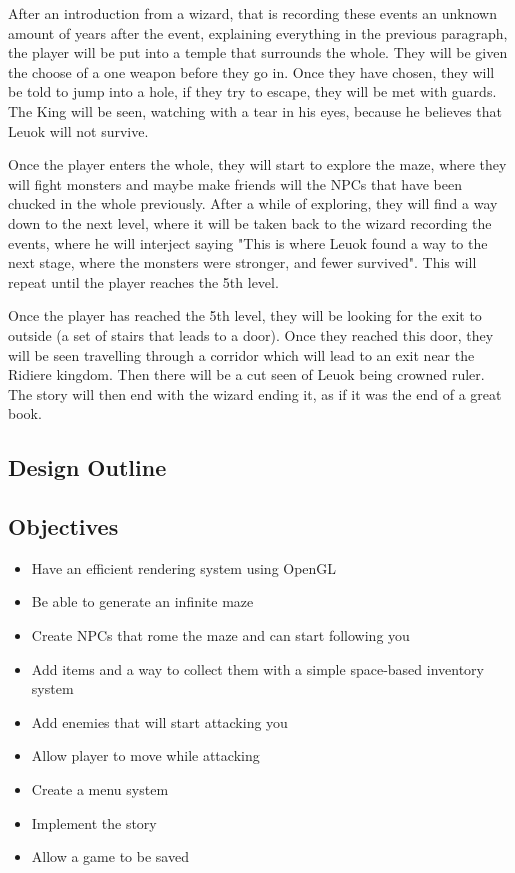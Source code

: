 \documentclass{article}
\begin{document}
                After an introduction from a wizard, that is recording these events an unknown amount of years after the event, explaining everything in the previous paragraph, the player will be put into a temple that surrounds the whole. They will be given the choose of a one weapon before they go in. Once they have chosen, they will be told to jump into a hole, if they try to escape, they will be met with guards. The King will be seen, watching with a tear in his eyes, because he believes that Leuok will not survive.

                Once the player enters the whole, they will start to explore the maze, where they will fight monsters and maybe make friends will the NPCs that have been chucked in the whole previously. After a while of exploring, they will find a way down to the next level, where it will be taken back to the wizard recording the events, where he will interject saying "This is where Leuok found a way to the next stage, where the monsters were stronger, and fewer survived". This will repeat until the player reaches the 5th level.

                Once the player has reached the 5th level, they will be looking for the exit to outside (a set of stairs that leads to a door). Once they reached this door, they will be seen travelling through a corridor which will lead to an exit near the Ridiere kingdom. Then there will be a cut seen of Leuok being crowned ruler. The story will then end with the wizard ending it, as if it was the end of a great book.
        \subsection{Design Outline}

        \subsection{Objectives}
            \begin{itemize}
                \item Have an efficient rendering system using OpenGL
                \item Be able to generate an infinite maze
                \item Create NPCs that rome the maze and can start following you
                \item Add items and a way to collect them with a simple space-based inventory system
                \item Add enemies that will start attacking you
                \item Allow player to move while attacking
                \item Create a menu system
                \item Implement the story
                \item Allow a game to be saved
            \end{itemize}
\end{document}
